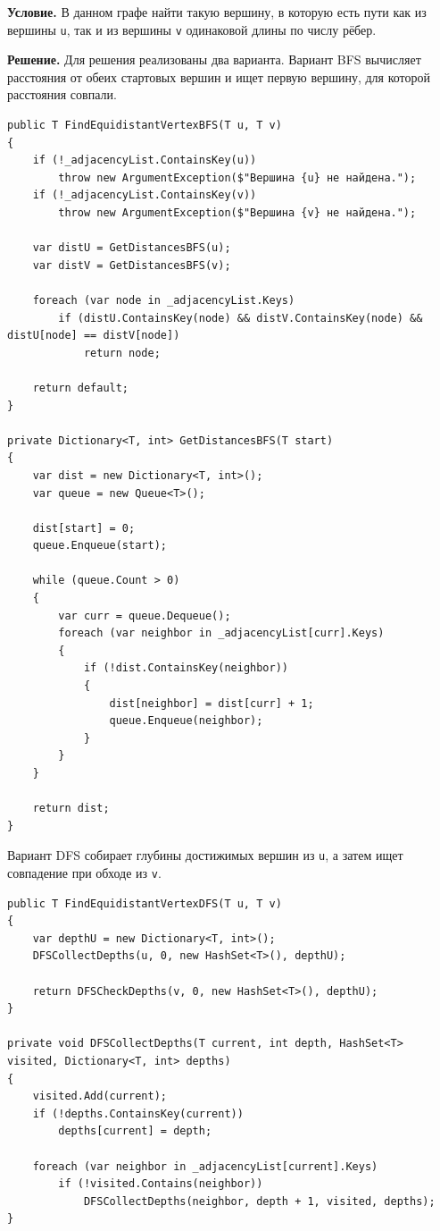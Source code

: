 \documentclass[pract]{SCWorks}
\newcommand{\smalltt}[1]{{\footnotesize\texttt{#1}}}
\begin{document}
    \textbf{Условие.}
    В данном графе найти такую вершину, в которую есть пути как из вершины \smalltt{u}, так и из вершины \smalltt{v} одинаковой длины по числу рёбер.

    \textbf{Решение.}
    Для решения реализованы два варианта.
    Вариант BFS вычисляет расстояния от обеих стартовых вершин и ищет первую вершину, для которой расстояния совпали.

    \begin{verbatim}
public T FindEquidistantVertexBFS(T u, T v)
{
    if (!_adjacencyList.ContainsKey(u))
        throw new ArgumentException($"Вершина {u} не найдена.");
    if (!_adjacencyList.ContainsKey(v))
        throw new ArgumentException($"Вершина {v} не найдена.");

    var distU = GetDistancesBFS(u);
    var distV = GetDistancesBFS(v);

    foreach (var node in _adjacencyList.Keys)
        if (distU.ContainsKey(node) && distV.ContainsKey(node) && distU[node] == distV[node])
            return node;

    return default;
}

private Dictionary<T, int> GetDistancesBFS(T start)
{
    var dist = new Dictionary<T, int>();
    var queue = new Queue<T>();

    dist[start] = 0;
    queue.Enqueue(start);

    while (queue.Count > 0)
    {
        var curr = queue.Dequeue();
        foreach (var neighbor in _adjacencyList[curr].Keys)
        {
            if (!dist.ContainsKey(neighbor))
            {
                dist[neighbor] = dist[curr] + 1;
                queue.Enqueue(neighbor);
            }
        }
    }

    return dist;
}
    \end{verbatim}

    Вариант DFS собирает глубины достижимых вершин из \smalltt{u}, а затем ищет совпадение при обходе из \smalltt{v}.

    \begin{verbatim}
public T FindEquidistantVertexDFS(T u, T v)
{
    var depthU = new Dictionary<T, int>();
    DFSCollectDepths(u, 0, new HashSet<T>(), depthU);

    return DFSCheckDepths(v, 0, new HashSet<T>(), depthU);
}

private void DFSCollectDepths(T current, int depth, HashSet<T> visited, Dictionary<T, int> depths)
{
    visited.Add(current);
    if (!depths.ContainsKey(current))
        depths[current] = depth;

    foreach (var neighbor in _adjacencyList[current].Keys)
        if (!visited.Contains(neighbor))
            DFSCollectDepths(neighbor, depth + 1, visited, depths);
}
    \end{verbatim}
\end{document}
